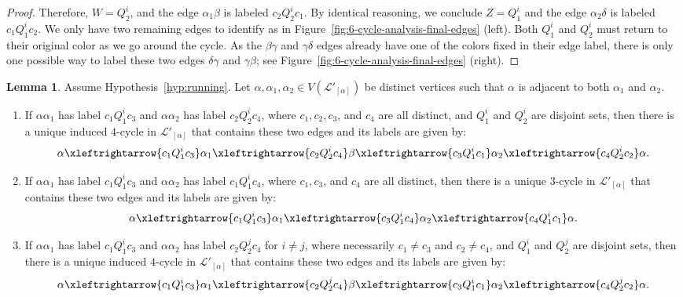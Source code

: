 \documentclass{amsart}
\theoremstyle{hypothesisstyle}
\theoremstyle{definition}
\newtheorem{lemma}[theorem]{Lemma}
\theoremstyle{remark}
\numberwithin{equation}{section}
\begin{document}
\begin{proof}
Therefore, $W=Q_2^i$, and the edge $\alpha_1\beta$ is labeled $c_2Q_2^ic_1$. By identical reasoning, we conclude $Z=Q_{1}^{i}$ and the edge $\alpha_2\delta$ is labeled $c_1Q_1^ic_2$. We only have two remaining edges to identify as in Figure~\ref{fig:6-cycle-analysis-final-edges} (left). Both $Q_{1}^{i}$ and $Q_{2}^{i}$ must return to their original color as we go around the cycle. As the $\beta\gamma$ and $\gamma\delta$ edges already have one of the colors fixed in their edge label, there is only one possible way to label these two edges $\delta \gamma$ and $\gamma\beta$; see Figure~\ref{fig:6-cycle-analysis-final-edges} (right). \end{proof}
 
\begin{lemma}\label{lem:squares-in-linked-graph} Assume Hypothesis~\ref{hyp:running}.  Let $\alpha, \alpha_1, \alpha_2 \in V(\mathcal{L}'_{[\alpha]})$ be distinct vertices such that $\alpha$ is adjacent to both $\alpha_1$ and $\alpha_2$. 
\begin{enumerate}
    \item If $\alpha\alpha_1$ has label $c_1Q_{1}^ic_3$ and $\alpha\alpha_2$ has label $c_2 Q_{2}^ic_4$, where $c_1,c_2,c_3$, and $c_4$ are all distinct, and $Q_{1}^i$ and $Q_2^{i}$ are disjoint sets, then there is a unique induced $4$-cycle in $\mathcal{L}'_{[\alpha]}$ that contains these two edges and its labels are given by:
     \[\alpha \xleftrightarrow{c_1Q^i_{1}c_3}  \alpha_1\xleftrightarrow{c_2Q^i_{2}c_4} \beta\xleftrightarrow{c_3Q^i_{1}c_1}\alpha_2\xleftrightarrow{c_4Q^i_{2}c_2}  \alpha.
\]
    \item If $\alpha\alpha_1$ has label $c_1Q_{1}^ic_3$ and $\alpha\alpha_2$ has label $c_1 Q_{1}^ic_4$, where $c_1,c_3$, and $c_4$ are all distinct, then there is a unique $3$-cycle in $\mathcal{L}'_{[\alpha]}$ that contains these two edges and its labels are given by: 
    \[\alpha \xleftrightarrow{c_1Q^i_{1}c_3}  \alpha_1\xleftrightarrow{c_3Q^i_{1}c_4} \alpha_2\xleftrightarrow{c_4Q^i_{1}c_1}  \alpha.
\]
    \item If $\alpha\alpha_1$ has label $c_1Q_{1}^ic_3$ and $\alpha\alpha_2$ has label $c_2 Q_{2}^jc_4$ for $i\neq j$, where necessarily $c_1\neq c_3$ and $c_2\neq c_4$, and $Q_1^i$ and $Q_2^j$ are disjoint sets, then there is a unique induced $4$-cycle in $\mathcal{L}'_{[\alpha]}$ that contains these two edges and its labels are given by: \[\alpha \xleftrightarrow{c_1Q^i_{1}c_3}  \alpha_1\xleftrightarrow{c_2Q^j_{2}c_4} \beta\xleftrightarrow{c_3Q^i_{1}c_1}\alpha_2\xleftrightarrow{c_4Q^j_{2}c_2}  \alpha.
\]
\end{enumerate}
\end{lemma}
\end{document}

